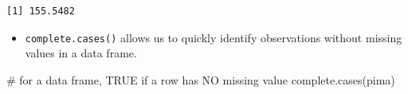 \documentclass[
  letterpaper,
  DIV=11,
  numbers=noendperiod]{scrreprt}
\newenvironment{Shaded}{\begin{snugshade}}{\end{snugshade}}
\newcommand{\CommentTok}[1]{\textcolor[rgb]{0.37,0.37,0.37}{#1}}
\newcommand{\FunctionTok}[1]{\textcolor[rgb]{0.28,0.35,0.67}{#1}}
\newcommand{\NormalTok}[1]{\textcolor[rgb]{0.00,0.23,0.31}{#1}}
\newcommand{\SpecialCharTok}[1]{\textcolor[rgb]{0.37,0.37,0.37}{#1}}
\providecommand{\tightlist}{%
  \setlength{\itemsep}{0pt}\setlength{\parskip}{0pt}}\usepackage{longtable,booktabs,array}
\begin{document}
\begin{Shaded}
\end{Shaded}

\begin{verbatim}
[1] 155.5482
\end{verbatim}

\begin{itemize}
\tightlist
\item
  \texttt{complete.cases()} allows us to quickly identify observations
  without missing values in a data frame.
\end{itemize}

\begin{Shaded}
\begin{Highlighting}[]
\CommentTok{\# for a data frame, TRUE if a row has NO missing value}
\FunctionTok{complete.cases}\NormalTok{(pima)  }
\end{Highlighting}
\end{Shaded}
\end{document}
